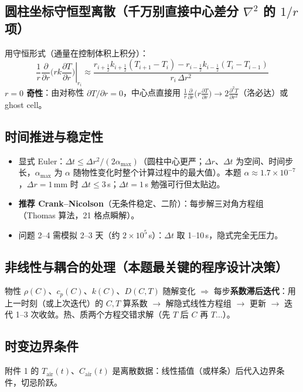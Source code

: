 \documentclass[12pt,a4paper]{ctexart}
\begin{document}
\subsection{圆柱坐标守恒型离散（千万别直接中心差分 $\nabla^2$ 的 $1/r$ 项）}
用守恒形式（通量在控制体积上积分）：
\begin{equation}
\left.\frac{1}{r}\frac{\partial}{\partial r}\Big(rk\frac{\partial T}{\partial r}\Big)\right|_{r_i}\approx
\frac{r_{i+\frac12}k_{i+\frac12}(T_{i+1}-T_i)-r_{i-\frac12}k_{i-\frac12}(T_i-T_{i-1})}{r_i\,\Delta r^2}
\end{equation}
\textbf{$r=0$ 奇性}：由对称性 $\partial T/\partial r=0$，中心点直接用 $\frac{1}{r}\frac{\partial}{\partial r}\big(r\frac{\partial T}{\partial r}\big)\to 2\frac{\partial^2T}{\partial r^2}$（洛必达）或 ghost cell。

\subsection{时间推进与稳定性}
\begin{itemize}
\item 显式 Euler：$\Delta t\le\Delta r^2/(2\alpha_{\max})$（圆柱中心更严；$\Delta r$、$\Delta t$ 为空间、时间步长，$\alpha_{\max}$ 为 $\alpha$ 随物性变化时整个计算过程中的最大值）。本题 $\alpha\approx1.7\times10^{-7}$，$\Delta r=1$\,mm 时 $\Delta t\le3$\,s；$\Delta t=1$\,s 勉强可行但太贴边。
\item \textbf{推荐 Crank--Nicolson}（无条件稳定、二阶）：每步解三对角方程组（Thomas 算法，21 格点瞬解）。
\item 问题 2--4 需模拟 2--3 天（约 $2\times10^5$\,s）：$\Delta t$ 取 1--10\,s，隐式完全无压力。
\end{itemize}

\subsection{非线性与耦合的处理（本题最关键的程序设计决策）}
物性 $\rho(C)$、$c_p(C)$、$k(C)$、$D(C,T)$ 随解变化 $\Rightarrow$ 每步\textbf{系数滞后迭代}：用上一时刻（或上次迭代）的 $C,T$ 算系数 $\to$ 解隐式线性方程组 $\to$ 更新 $\to$ 迭代 1--3 次收敛。热、质两个方程交错求解（先 $T$ 后 $C$ 再 $T\dots$）。

\subsection{时变边界条件}
附件 1 的 $T_{\mathrm{air}}(t)$、$C_{\mathrm{air}}(t)$ 是离散数据：线性插值（或样条）后代入边界条件，切忌阶跃。
\end{document}
